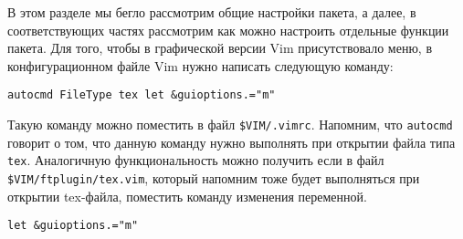 \documentclass[a4paper]{article}
\begin{document}
В этом разделе мы бегло рассмотрим общие настройки пакета, а далее, в соответствующих частях 
рассмотрим как можно настроить отдельные функции пакета.
Для того, чтобы в графической версии Vim присутствовало меню, в конфигурационном файле Vim нужно 
написать следующую команду:
\begin{verbatim}
autocmd FileType tex let &guioptions.="m"
\end{verbatim}
Такую команду можно поместить в файл \verb|$VIM/.vimrc|. Напомним, что \texttt{autocmd} говорит
о том, что данную команду нужно выполнять при открытии файла типа \texttt{tex}. Аналогичную 
функциональность можно получить если в файл \verb|$VIM/ftplugin/tex.vim|, который напомним 
тоже будет выполняться при открытии tex-файла, поместить команду изменения переменной.
\begin{verbatim}
let &guioptions.="m"
\end{verbatim}
\end{document}
